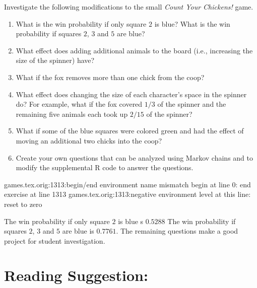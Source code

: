 \documentclass[12pt]{article}
\begin{document}
\begin{exercise}
    Investigate the following modifications to the small \emph{Count
    Your Chickens!} game.
    \begin{enumerate}[label=(\alph*)]
    \item
        What is the win probability if only square \( 2 \) is blue? What
        is the win probability if squares \( 2 \), \( 3 \) and \( 5 \)
        are blue?
    \item
        What effect does adding additional animals to the board (i.e.,
        increasing the size of the spinner) have?
    \item
        What if the fox removes more than one chick from the coop?
    \item
        What effect does changing the size of each character's space in
        the spinner do?  For example, what if the fox covered \( 1/3 \)
        of the spinner and the remaining five animals each took up \(
        2/15 \) of the spinner?
    \item
        What if some of the blue squares were colored green and had the
        effect of moving an additional two chicks into the coop?
    \item
        Create your own questions that can be analyzed using Markov
        chains and to modify the supplemental R code to answer the
        questions.
\end{enumerate}
games.tex.orig:1313:begin/end environment name mismatch
	begin {} at line 0: end {exercise} at line 1313
games.tex.orig:1313:negative environment level at this line: reset to zero
\end{exercise}
\begin{solution}
    The win probability if only square \( 2 \) is blue s \( 0.5288 \)
    The win probability if squares \( 2 \), \( 3 \) and \( 5 \) are blue
    is \( 0.7761 \).  The remaining questions make a good project for
    student investigation.
\end{solution}

\hr

\section*{Reading Suggestion:}



\end{document}
